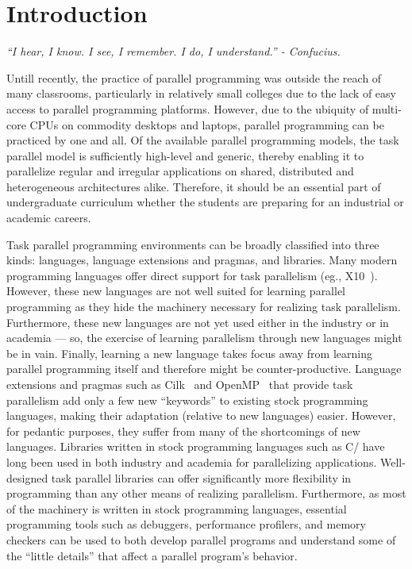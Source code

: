 \documentclass[9pt,twocolumn,letter]{article}
\begin{document}
\section{Introduction}
\begin{center}
\small{\textit{``I hear, I know. I see, I remember. I do, I understand.'' -
Confucius.}}
\end{center}
%
Untill recently, 
the practice of parallel programming was outside the reach of many 
classrooms, particularly in relatively small colleges
due to the lack of easy access to parallel programming platforms.
% 
However, due to the ubiquity of multi-core CPUs on commodity
desktops and laptops, parallel programming can be practiced by one and all.
Of the available parallel programming models, the task parallel model is 
sufficiently high-level and generic, thereby enabling it to parallelize regular
and irregular applications on shared, distributed and heterogeneous
architectures alike.  
%
Therefore, it should be an essential part of undergraduate curriculum whether
the students are preparing for an industrial or academic careers.

Task parallel programming environments can be broadly classified into three
kinds: languages, language extensions and pragmas, and libraries.
Many modern programming languages offer direct support for task parallelism
(eg., X10~\cite{Charles:2005p1232}).
%
However, these new languages are not well suited for learning parallel
programming as they hide the machinery necessary for realizing task
parallelism.
%
Furthermore, these new languages are not yet used either in the industry or in
academia --- so, the exercise of learning parallelism through new languages 
might be in vain.
%
Finally, learning a new language takes focus away from learning parallel
programming itself and therefore might be counter-productive.
Language extensions and pragmas such as Cilk~\cite{FrigoLeRa98} and
OpenMP~\cite{kn:omp_30} that provide task parallelism add only a few new
``keywords'' to existing stock programming languages, making their adaptation
(relative to new languages) easier.
%
However, for pedantic purposes, they suffer from many of the shortcomings of
new languages.
Libraries written in stock programming languages such as C/\Cpp{} have long 
been used in both industry and academia for parallelizing applications.
%
Well-designed task parallel libraries can offer significantly more
flexibility in programming than any other means of realizing
parallelism.
%
Furthermore, as most of the machinery is written in stock programming
languages, essential programming tools such as debuggers, performance
profilers, and memory checkers can be used to both develop parallel programs
and understand some of the ``little details'' that affect a parallel program's
behavior.
\end{document}
